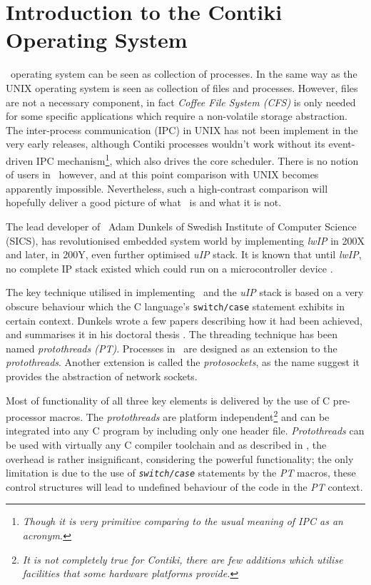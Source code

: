 \section{Introduction to the Contiki Operating System}\label{sec:CONTIKI}

  \Contiki\ operating system can be seen as collection of processes.
 In the same way as the UNIX operating system is seen as collection of
 files and processes. However, files are not a necessary component, in
 fact \emph{Coffee File System (CFS)} is only needed for some specific
 applications which require a non-volatile storage abstraction. 
  The inter-process communication (IPC) in UNIX has not been implement
 in the very early releases, although Contiki processes wouldn't work
 without its event-driven IPC mechanism\footnote{\emph{Though it is very
 primitive comparing to the usual meaning of IPC as an acronym.}}, which also
 drives the core scheduler. There is no notion of users in \Contiki\,
 however, and at this point comparison with UNIX becomes apparently
 impossible. Nevertheless, such a high-contrast comparison will hopefully
 deliver a good picture of what \ContikiOS\ is and what it is not.


  The lead developer of \Contiki\, Adam Dunkels of Swedish Institute of
 Computer Science (SICS), has revolutionised embedded system world by
 implementing \emph{lwIP} in 200X and later, in 200Y, even further optimised
 \emph{uIP} stack. It is known that until \emph{lwIP}, no complete IP stack
 existed which could run on a microcontroller device \cite{dunkels03full}.

  The key technique utilised in implementing \Contiki\ and the \emph{uIP}
 stack is based on a very obscure behaviour which the C language's
 \texttt{switch/case} statement exhibits in certain context. Dunkels
 wrote a few papers \cite{dunkels05protothreads,dunkels06protothreads}
 describing how it had been achieved, and summarises it in his doctoral
 thesis \cite{dunkels07programming}. The threading technique has been
 named \emph{protothreads (PT)}. Processes in \Contiki\ are designed as
 an extension to the \emph{protothreads}. Another extension is called
 the \emph{protosockets}, as the name suggest it provides the abstraction
 of network sockets.

  Most of functionality of all three key elements is delivered by the use
 of C pre-processor macros. The \emph{protothreads} are platform
 independent\footnote{\emph{It is not completely true for Contiki, there
 are few additions which utilise facilities that some hardware platforms provide.}}
 and can be integrated into any C program by including only one header file.
 \emph{Protothreads} can be used with virtually any C compiler toolchain and
 as described in \cite{dunkels06protothreads}, the overhead is rather
 insignificant, considering the powerful functionality; the only limitation
 is due to the use of \emph{\texttt{switch/case}} statements by the \emph{PT}
 macros, these control structures will lead to undefined behaviour of the
 code in the \emph{PT} context.

